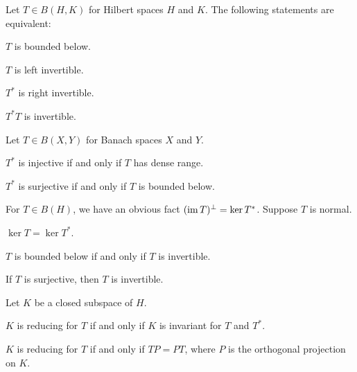 \documentclass{../note}
\begin{document}
\begin{prb}
Let $T\in B(H,K)$ for Hilbert spaces $H$ and $K$.
The following statements are equivalent:
\begin{parts}
\item $T$ is bounded below.
\item $T$ is left invertible.
\item $T^*$ is right invertible.
\item $T^*T$ is invertible.
\end{parts}
\end{prb}

\begin{prb}
Let $T\in B(X,Y)$ for Banach spaces $X$ and $Y$.
\begin{parts}
\item $T^*$ is injective if and only if $T$ has dense range.
\item $T^*$ is surjective if and only if $T$ is bounded below.
\end{parts}
\end{prb}

\begin{prb}
For $T\in B(H)$, we have an obvious fact $(\operatorname{im} T)^\perp=\ker T^*$.
Suppose $T$ is normal.
\begin{parts}
\item $\ker T=\ker T^*$.
\item $T$ is bounded below if and only if $T$ is invertible.
\item If $T$ is surjective, then $T$ is invertible.
\end{parts}
\end{prb}

\begin{prb}
Let $K$ be a closed subspace of $H$.
\begin{parts}
\item $K$ is reducing for $T$ if and only if $K$ is invariant for $T$ and $T^*$.
\item $K$ is reducing for $T$ if and only if $TP=PT$, where $P$ is the orthogonal projection on $K$.
\end{parts}
\end{prb}
\end{document}
